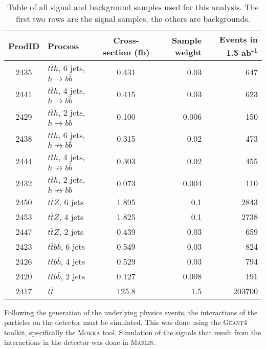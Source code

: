 \begin{table}[htp]
\centering
	\begin{tabular}{ c l c r r }
	\hline \hline
	ProdID & Process & Cross-section (fb) & Sample weight & Events in 1.5 ab\textsuperscript{-1} \\ \hline \hline
	2435 & $t\overline{t}h$, 6 jets, $h \rightarrow b\overline{b}$ & 0.431 & 0.03 & 647 \\
	2441 & $t\overline{t}h$, 4 jets, $h \rightarrow b\overline{b}$ & 0.415 & 0.03 & 623 \\ \hline
	2429 & $t\overline{t}h$, 2 jets, $h \rightarrow b\overline{b}$ & 0.100 & 0.006 & 150 \\

	2438 & $t\overline{t}h$, 6 jets, $h \not\rightarrow b\overline{b}$ & 0.315 & 0.02 & 473	 \\
	2444 & $t\overline{t}h$, 4 jets, $h \not\rightarrow b\overline{b}$ & 0.303 & 0.02 & 455 \\
	2432 & $t\overline{t}h$, 2 jets, $h \not\rightarrow b\overline{b}$ & 0.073 & 0.004 & 110 \\

	2450 & $t\overline{t}Z$, 6 jets & 1.895 & 0.1 & 2843 \\
	2453 & $t\overline{t}Z$, 4 jets & 1.825 & 0.1 & 2738 \\
	2447 & $t\overline{t}Z$, 2 jets & 0.439 & 0.03 & 659 \\
	
	2423 & $t\overline{t}b\overline{b}$, 6 jets & 0.549 & 0.03 & 824 \\
	2426 & $t\overline{t}b\overline{b}$, 4 jets & 0.529 & 0.03 & 794 \\
	2420 & $t\overline{t}b\overline{b}$, 2 jets & 0.127 & 0.008 & 191 \\

	2417 & $t\overline{t}$ & 125.8 & 1.5 & 203700 \\ \hline

	\end{tabular}
	\caption{Table of all signal and background samples used for this analysis. The first two rows are the signal samples, the others are backgrounds.}
	\label{table:physics/SM/generatedsamples}
\end{table}

Following the generation of the underlying physics events, the interactions of the particles on the detector must be simulated. This was done using the \textsc{Geant4} toolkit, specifically the \textsc{Mokka} tool. Simulation of the signals that result from the interactions in the detector was done in \textsc{Marlin}.

